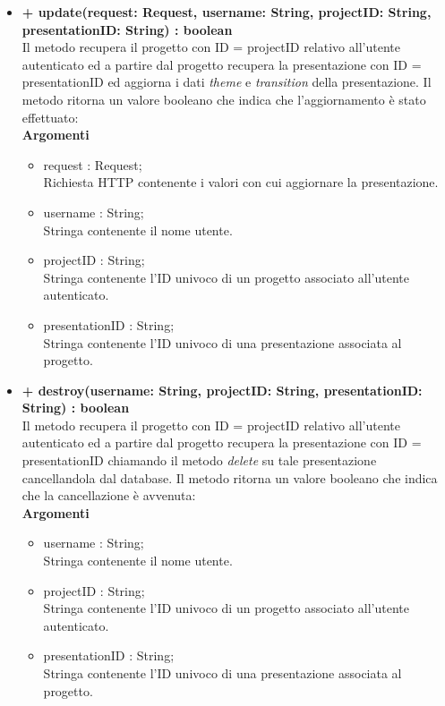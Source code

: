 \begin{itemize}
			\item \textbf{+ update(request: Request, username: String, projectID: String, presentationID: String) : boolean}\\
			Il metodo recupera il progetto con ID = projectID relativo all'utente autenticato ed a partire dal progetto recupera la presentazione con ID = presentationID ed aggiorna i dati \textit{theme} e \textit{transition} della presentazione. Il metodo ritorna un valore booleano che indica che l'aggiornamento è stato effettuato:\\
			\textbf{Argomenti}
			\begin{itemize}
				\item request : Request;\\
				Richiesta HTTP contenente i valori con cui aggiornare la presentazione.
				\item username : String; \\
				Stringa contenente il nome utente.
				\item projectID : String; \\
				Stringa contenente l'ID univoco di un progetto associato all'utente autenticato.
				\item presentationID : String; \\
				Stringa contenente l'ID univoco di una presentazione associata al progetto.
			\end{itemize}
			\newpage
			\item \textbf{+ destroy(username: String, projectID: String, presentationID: String) : boolean}\\
			Il metodo recupera il progetto con ID = projectID relativo all'utente autenticato ed a partire dal progetto recupera la presentazione con ID = presentationID chiamando il metodo \textit{delete} su tale presentazione cancellandola dal database. Il metodo ritorna un valore booleano che indica che la cancellazione è avvenuta:\\
			\textbf{Argomenti}
			\begin{itemize}
				\item username : String; \\
				Stringa contenente il nome utente.
				\item projectID : String; \\
				Stringa contenente l'ID univoco di un progetto associato all'utente autenticato.
				\item presentationID : String; \\
				Stringa contenente l'ID univoco di una presentazione associata al progetto.
			\end{itemize}
		\end{itemize}
		
